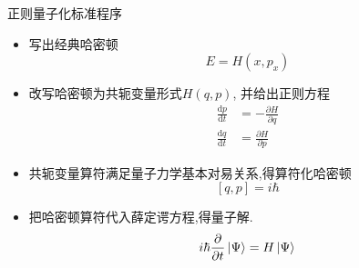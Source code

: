 \begin{remark}{正则量子化标准程序}
    \begin{itemize}
      \item 写出经典哈密顿
        \[E=H(x,p_x)\]
      \item 改写哈密顿为共轭变量形式$H(q,p)$, 并给出正则方程 
      \[ \begin{aligned}
        \frac{\mathrm{d}p}{\mathrm{d}t} &= - \frac{\partial H}{\partial q}  \\ 
        \frac{\mathrm{d}q}{\mathrm{d}t} &= \frac{\partial H}{\partial p} 
      \end{aligned} 
      \] 
      \item 共轭变量算符满足量子力学基本对易关系,得算符化哈密顿
       \[ [q,p] =i\hbar \]
      \item 把哈密顿算符代入薛定谔方程,得量子解. 
      \[i\hbar \frac{\partial }{\partial t} \left| \Psi\right\rangle  =H \left| \Psi\right\rangle   \]
    \end{itemize}
\end{remark}

